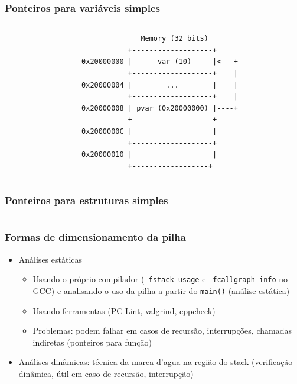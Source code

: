 \documentclass{beamer}
\begin{document}
\begin{frame}[fragile]
	\frametitle{Ponteiros para variáveis simples}
	\begin{columns}[T] %
	\begin{column}{.50\textwidth}
		
	\end{column}%
	\hfill%
	\begin{column}{.50\textwidth}
	 {\tiny 
	\begin{verbatim}
              Memory (32 bits)
           +-------------------+
0x20000000 |      var (10)     |<---+
           +-------------------+    |
0x20000004 |        ...        |    |
           +-------------------+    |
0x20000008 | pvar (0x20000000) |----+
           +-------------------+
0x2000000C |                   |
           +-------------------+
0x20000010 |                   |
           +------------------+
	\end{verbatim}
}

	\end{column}%
\end{columns}	
\end{frame}

\begin{frame}[fragile]
	\frametitle{Ponteiros para estruturas simples}
	\begin{columns}[T] %
	\begin{column}{.75\textwidth}
		
	\end{column}%
	\hfill%
	\begin{column}{.25\textwidth}
	\end{column}%
\end{columns}	
\end{frame}

\begin{frame}
	\frametitle{Formas de dimensionamento da pilha}
	\begin{itemize}
		\item Análises estáticas
		\begin{itemize}
			\item Usando o próprio compilador (\texttt{-fstack-usage} e \texttt{-fcallgraph-info} no GCC) e analisando o uso da pilha a partir do \texttt{main()} (análise estática)
			\item Usando ferramentas (PC-Lint, valgrind, cppcheck)
			\item Problemas: podem falhar em casos de recursão, interrupções, chamadas indiretas (ponteiros para função)
		\end{itemize}
		\item Análises dinâmicas: técnica da marca d'agua na região do stack (verificação dinâmica, útil em caso de recursão, interrupção)
		\end{itemize}		
\end{frame}
\end{document}
